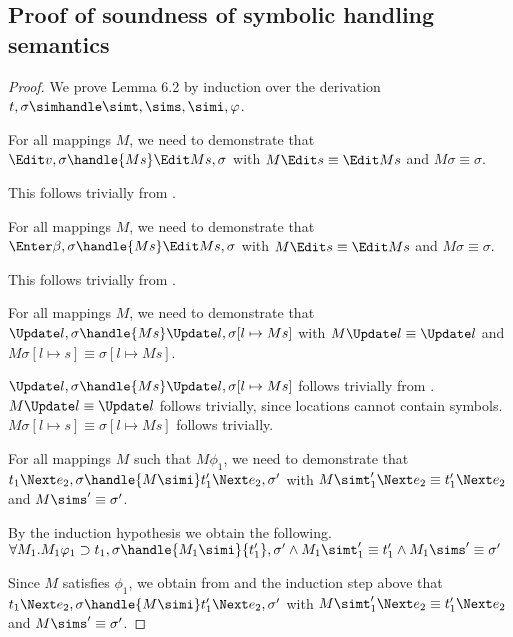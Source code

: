 \subsection{Proof of soundness of symbolic handling semantics}

\label{appendix:symbolicsoundhandle}
\begin{proof}
  We prove Lemma 6.2 by induction over the derivation $t,\sigma\simhandle\simt,\sims,\simi,\phi$.

    {
    For all mappings $M$, we need to demonstrate that $\Edit v,\sigma\handle{M s}\Edit M s,\sigma$ with $M\Edit s\equiv \Edit M s$ and $ M\sigma\equiv {\sigma}$.

    This follows trivially from .

    }

  {For all mappings $M$, we need to demonstrate that
  $\Enter\beta,\sigma\handle{M s} \Edit M s,\sigma$ with
  $M \Edit s \equiv \Edit M s$ and $ M\sigma\equiv {\sigma}$.

  This follows trivially from .

  }

  {
  For all mappings $M$,
  we need to demonstrate that\\
  $\Update l,\sigma\handle{M s}\Update l,\sigma[l\mapsto M s]$ with
  $M \Update l \equiv \Update l$ and $ M\sigma[l\mapsto s]\equiv {\sigma}[l\mapsto M s]$.

  $\Update l,\sigma\handle{M s}\Update l,\sigma[l\mapsto M s]$ follows trivially from .
  $M \Update l \equiv \Update l$ follows trivially, since locations cannot contain symbols.
  $ M\sigma[l\mapsto s]\equiv {\sigma}[l\mapsto M s]$ follows trivially.

  }


  {For all mappings $M$ such that $M\phi_1$, we need to demonstrate that
  $t_1\Next e_2,\sigma\handle{M \simi} t_1'\Next e_2,\sigma'$ with
  $M \simt_1' \Next e_2 \equiv {t_1'}\Next e_2$ and $M\sims'\equiv{\sigma'}$.

  By the induction hypothesis we obtain the following.
  $\forall M_1 . M_1 \phi_1 \implies t_1,\sigma \handle{M_1 \simi} {t_1'},{\sigma'}\land M_1 \simt_1'\equiv{t_1'}\land M_1\sims' \equiv {\sigma'}$

  Since $M$ satisfies $\phi_1$, we obtain from  and the induction step above that $t_1\Next e_2,\sigma\handle{M \simi} t_1'\Next e_2,\sigma'$ with
  $M \simt_1' \Next e_2 \equiv {t_1'}\Next e_2$ and $M\sims'\equiv{\sigma'}$.



}
\end{proof}
